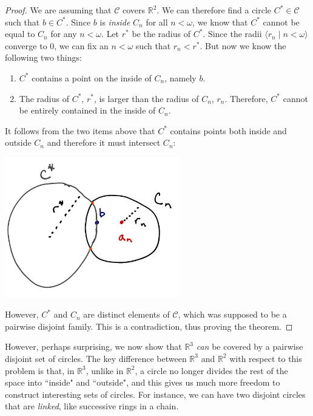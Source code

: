 \documentclass[a4paper]{memoir}
\theoremstyle{definition}
\newcommand{\bb}{\mathbb}
\newcommand{\mc}{\mathcal}
\begin{document}
\begin{proof}
  We are assuming that $\mc{C}$ covers $\bb{R}^2$. We can therefore find a circle 
  $C^* \in \mc{C}$ such that $b \in C^*$. Since $b$ is \emph{inside} $C_n$ for all $n < \omega$, 
  we know that $C^*$ cannot be equal to $C_n$ for any $n < \omega$. Let $r^*$ be the radius of $C^*$. Since 
  the radii $\langle r_n \mid n < \omega \rangle$ converge to $0$, we can fix an 
  $n < \omega$ such that $r_n < r^*$. But now we know the following two things:
  \begin{enumerate}
    \item $C^*$ contains a point on the inside of $C_n$, namely $b$.
    \item The radius of $C^*$, $r^*$, is larger than the radius of $C_n$, $r_n$. Therefore, 
    $C^*$ cannot be entirely contained in the inside of $C_n$.
  \end{enumerate}
  It follows from the two items above that $C^*$ contains points both inside and outside $C_n$ 
  and therefore it must intersect $C_n$:
  \begin{center}
    \includegraphics[width=3in]{intersecting-circles}
  \end{center}
  However, $C^*$ and $C_n$ are distinct elements of $\mathcal{C}$, which was supposed to be a pairwise 
  disjoint family. This is a contradiction, thus proving the theorem.
\end{proof}

However, perhaps surprising, we now show that $\bb{R}^3$ \emph{can} be covered by a pairwise 
disjoint set of circles. The key difference between $\bb{R}^3$ and $\bb{R}^2$ with respect to 
this problem is that, in $\bb{R}^3$, unlike in $\bb{R}^2$, a circle no longer divides the 
rest of the space into ``inside" and ``outside", and this gives us much more freedom to construct 
interesting sets of circles. For instance, we can have two disjoint circles that are \emph{linked}, 
like successive rings in a chain.
\end{document}
